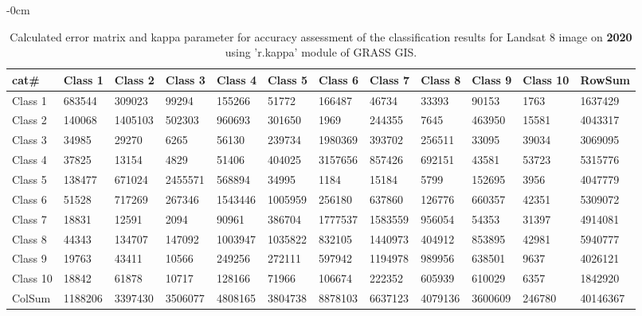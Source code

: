 \documentclass[analytics,article,submit,pdftex,moreauthors]{Definitions/mdpi}
\begin{document}
\begin{table}[H] 
\footnotesize
    \centering
    \begin{adjustwidth}{-\extralength}{0cm}
    \caption{Calculated error matrix and kappa parameter for accuracy assessment of the classification results for Landsat 8 image on \textbf{2020} using 'r.kappa' module of GRASS GIS.\label{tab03}}
 	\begin{tabularx}{\fulllength}{|l|l|l|l|l|l|l|l|l|l|l|l|}
    \toprule
        \textbf{cat\#} & \textbf{Class 1} & \textbf{Class 2} & \textbf{Class 3} & \textbf{Class 4} & \textbf{Class 5} & \textbf{Class 6} & \textbf{Class 7} & \textbf{Class 8} & \textbf{Class 9} & \textbf{Class 10} & \textbf{RowSum} \\ \hline
        Class 1 & \cellcolor{green!10}683544 & 309023 & 99294 & 155266 & 51772 & 166487 & 46734 & 33393 & 90153 & 1763 & 1637429 \\ \hline
        Class 2 & 140068 & \cellcolor{green!10}1405103 & 502303 & 960693 & 301650 & 1969 & 244355 & 7645 & 463950 & 15581 & 4043317 \\ \hline
        Class 3 & 34985 & 29270 & \cellcolor{green!10}6265 & 56130 & 239734 & 1980369 & 393702 & 256511 & 33095 & 39034 & 3069095 \\ \hline
        Class 4 & 37825 & 13154 & 4829 & \cellcolor{green!10}51406 & 404025 & 3157656 & 857426 & 692151 & 43581 & 53723 & 5315776 \\ \hline
        Class 5 & 138477 & 671024 & 2455571 & 568894 & \cellcolor{green!10}34995 & 1184 & 15184 & 5799 & 152695 & 3956 & 4047779 \\ \hline
        Class 6 & 51528 & 717269 & 267346 & 1543446 & 1005959 & \cellcolor{green!10}256180 & 637860 & 126776 & 660357 & 42351 & 5309072 \\ \hline
        Class 7 & 18831 & 12591 & 2094 & 90961 & 386704 & 1777537 & \cellcolor{green!10}1583559 & 956054 & 54353 & 31397 & 4914081 \\ \hline
        Class 8 & 44343 & 134707 & 147092 & 1003947 & 1035822 & 832105 & 1440973 & \cellcolor{green!10}404912 & 853895 & 42981 & 5940777 \\ \hline
        Class 9 & 19763 & 43411 & 10566 & 249256 & 272111 & 597942 & 1194978 & 989956 & \cellcolor{green!10}638501 & 9637 & 4026121 \\ \hline
        Class 10 & 18842 & 61878 & 10717 & 128166 & 71966 & 106674 & 222352 & 605939 & 610029 & \cellcolor{green!10}6357 & 1842920 \\ \hline
        ColSum & 1188206 & 3397430 & 3506077 & 4808165 & 3804738 & 8878103 & 6637123 & 4079136 & 3600609 & 246780 & \cellcolor{green!10}40146367 \\ \hline

        \bottomrule
    \end{tabularx}
    \end{adjustwidth}
\end{table}
\end{document}
